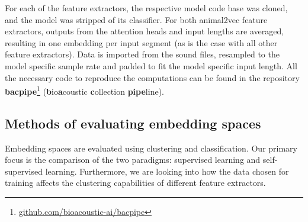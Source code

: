 For each of the feature extractors, the respective model code base was cloned, and the model was stripped of its classifier.
For both animal2vec feature extractors, outputs from the attention heads and input lengths are averaged, resulting in one embedding per input segment (as is the case with all other feature extractors).
Data is imported from the sound files, resampled to the model specific sample rate and padded to fit the model specific input length.
All the necessary code to reproduce the computations can be found in the repository \textbf{bacpipe}\footnote{\url{github.com/bioacoustic-ai/bacpipe}} (\textbf{b}io\textbf{a}coustic \textbf{c}ollection \textbf{pipe}line).

\subsection{Methods of evaluating embedding spaces}
\label{ssub:eval_dim_reduc}

Embedding spaces are evaluated using clustering and classification.
Our primary focus is the comparison of the two paradigms: supervised learning and self-supervised learning.
Furthermore, we are looking into how the data chosen for training affects the clustering capabilities of different feature extractors.




